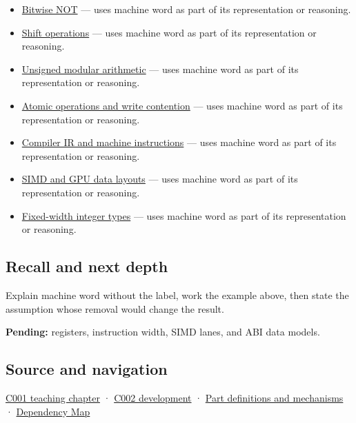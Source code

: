 \begin{itemize}
\tightlist
\item
  \hyperref[appendix-8f38927cfc54]{Bitwise NOT} --- uses machine word as part of its representation or reasoning.
\item
  \hyperref[appendix-73425b25118e]{Shift operations} --- uses machine word as part of its representation or reasoning.
\item
  \hyperref[appendix-c99977d88b33]{Unsigned modular arithmetic} --- uses machine word as part of its representation or reasoning.
\item
  \hyperref[appendix-e12d1b03fefb]{Atomic operations and write contention} --- uses machine word as part of its representation or reasoning.
\item
  \hyperref[appendix-942ad41afb30]{Compiler IR and machine instructions} --- uses machine word as part of its representation or reasoning.
\item
  \hyperref[appendix-3c7b1a56de01]{SIMD and GPU data layouts} --- uses machine word as part of its representation or reasoning.
\item
  \hyperref[appendix-cc04044b5782]{Fixed-width integer types} --- uses machine word as part of its representation or reasoning.
\end{itemize}

\subsection{Recall and next depth}\label{appendix-d67a19507dc5-recall-and-next-depth}

Explain machine word without the label, work the example above, then state the assumption whose removal would change the result.

\textbf{Pending:} registers, instruction width, SIMD lanes, and ABI data models.

\subsection{Source and navigation}\label{appendix-d67a19507dc5-source-and-navigation}

\hyperref[01-foundations-i-ch001-from-a-signal-to-an-interpretation]{C001 teaching chapter} · \hyperref[01-foundations-i-ch001-arithmetic-becomes-a-policy]{C002 development} · \hyperref[appendix-fd090d982a15]{Part definitions and mechanisms} · \hyperref[appendix-4ad47bdd269a]{Dependency Map}
